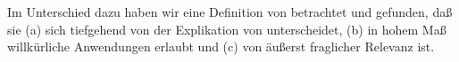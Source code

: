 \documentclass[output=paper]{langsci/langscibook}
\begin{document}
Im Unterschied dazu haben wir eine Definition von  betrachtet und gefunden, daß sie (a) sich tiefgehend von der Explikation von   unterscheidet, (b) in hohem Maß willkürliche Anwendungen
erlaubt und (c) von äußerst fraglicher Relevanz ist.

\sloppy
\printbibliography[heading=subbibliography,notkeyword=this]
\label{chap-normale-Betonung-end}
\end{document}
